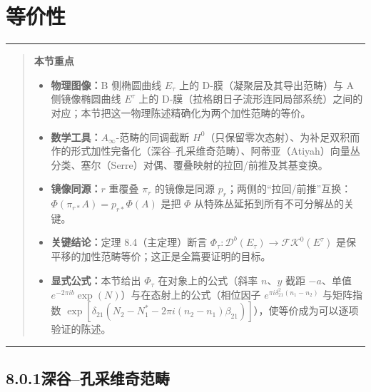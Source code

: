 \documentclass[11pt,a4paper]{article}
\theoremstyle{plain}
\theoremstyle{definition}
\newenvironment{keytakeaways}[1][本节重点]{%
  \par\addvspace{9pt}%
  \noindent\rule{\linewidth}{0.7pt}\par\nobreak
  \begin{quote}\noindent\textbf{#1}\par\small
}{%
  \end{quote}%
  \noindent\rule{\linewidth}{0.7pt}\par\addvspace{7pt}%
}
\begin{document}
\section{等价性}

\begin{keytakeaways}
\begin{itemize}[leftmargin=1.6em,itemsep=1pt,topsep=2pt]
  \item \textbf{物理图像：}B 侧椭圆曲线 $E_\tau$ 上的 D-膜（凝聚层及其导出范畴）与 A 侧镜像椭圆曲线 $E^\tau$ 上的 D-膜（拉格朗日子流形连同局部系统）之间的对应；本节把这一物理陈述精确化为两个加性范畴的等价。
  \item \textbf{数学工具：}$A_\infty$-范畴的同调截断 $H^0$（只保留零次态射）、为补足双积而作的形式加性完备化（深谷–孔采维奇范畴）、阿蒂亚（Atiyah）向量丛分类、塞尔（Serre）对偶、覆叠映射的拉回/前推及其基变换。
  \item \textbf{镜像同源：}$r$ 重覆叠 $\pi_r$ 的镜像是同源 $p_r$；两侧的“拉回/前推”互换：$\Phi(\pi_{r*}A)=p_{r*}\Phi(A)$ 是把 $\Phi$ 从特殊丛延拓到所有不可分解丛的关键。
  \item \textbf{关键结论：}定理 8.4（主定理）断言 $\Phi_\tau:\mathcal{D}^b(E_\tau)\to\mathcal{FK}^0(E^\tau)$ 是保平移的加性范畴等价；这正是全篇要证明的目标。
  \item \textbf{显式公式：}本节给出 $\Phi_\tau$ 在对象上的公式（斜率 $n$、$y$ 截距 $-a$、单值 $e^{-2\pi ib}\exp(N)$）与在态射上的公式（相位因子 $e^{\pi i\delta_{21}^2(n_1-n_2)}$ 与矩阵指数 $\exp[\delta_{21}(N_2-N_1^*-2\pi i(n_2-n_1)\beta_{21})]$），使等价成为可以逐项验证的陈述。
\end{itemize}
\end{keytakeaways}


\subsection*{8.0.1\quad 深谷–孔采维奇范畴}
\end{document}

